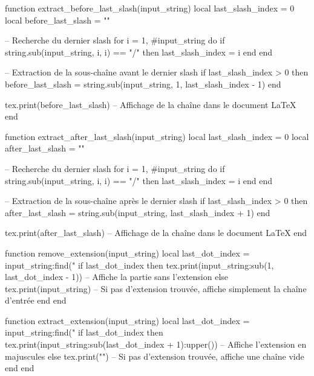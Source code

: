 \usepackage{luacode}

\begin{luacode*}
    function extract_before_last_slash(input_string)
        local last_slash_index = 0
        local before_last_slash = ""
    
        -- Recherche du dernier slash
        for i = 1, #input_string do
            if string.sub(input_string, i, i) == "/" then
                last_slash_index = i
            end
        end
    
        -- Extraction de la sous-chaîne avant le dernier slash
        if last_slash_index > 0 then
            before_last_slash = string.sub(input_string, 1, last_slash_index - 1)
        end
    
        tex.print(before_last_slash) -- Affichage de la chaîne dans le document LaTeX
    end
    
function extract_after_last_slash(input_string)
        local last_slash_index = 0
        local after_last_slash = ""
    
        -- Recherche du dernier slash
        for i = 1, #input_string do
            if string.sub(input_string, i, i) == "/" then
                last_slash_index = i
            end
        end
    
        -- Extraction de la sous-chaîne après le dernier slash
        if last_slash_index > 0 then
            after_last_slash = string.sub(input_string, last_slash_index + 1)
        end
    
        tex.print(after_last_slash) -- Affichage de la chaîne dans le document LaTeX
    end
    
    
function remove_extension(input_string)
    local last_dot_index = input_string:find("%
    if last_dot_index then
        tex.print(input_string:sub(1, last_dot_index - 1)) -- Affiche la partie sans l'extension
    else
        tex.print(input_string) -- Si pas d'extension trouvée, affiche simplement la chaîne d'entrée
    end
end
    
    function extract_extension(input_string)
    local last_dot_index = input_string:find("%
    if last_dot_index then
        tex.print(input_string:sub(last_dot_index + 1):upper()) -- Affiche l'extension en majuscules
    else
        tex.print("") -- Si pas d'extension trouvée, affiche une chaîne vide
    end
end
\end{luacode*}
    
\newcommand{\ExtractBeforeLastSlash}[1]{\directlua{extract_before_last_slash("#1")}}
\newcommand{\ExtractAfterLastSlash}[1]{\directlua{extract_after_last_slash("#1")}}
\newcommand{\RemoveExtension}[1]{\directlua{remove_extension("#1")}}
\newcommand{\ExtractExtension}[1]{\directlua{extract_extension("#1")}}